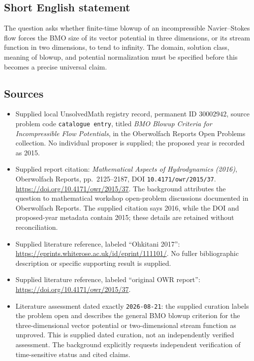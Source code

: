 \documentclass[11pt]{article}
\begin{document}
\subsection{Short English statement}
The question asks whether finite-time blowup of an incompressible Navier--Stokes flow forces the BMO size of its vector potential in three dimensions, or its stream function in two dimensions, to tend to infinity. The domain, solution class, meaning of blowup, and potential normalization must be specified before this becomes a precise universal claim.
\subsection{Sources}
\begin{itemize}
\item Supplied local UnsolvedMath registry record, permanent ID \(30002942\), source problem code \texttt{catalogue entry}, titled \emph{BMO Blowup Criteria for Incompressible Flow Potentials}, in the Oberwolfach Reports Open Problems collection. No individual proposer is supplied; the proposed year is recorded as 2015.
\item Supplied report citation: \emph{Mathematical Aspects of Hydrodynamics (2016)}, Oberwolfach Reports, pp.\ 2125--2187, DOI \texttt{10.4171/owr/2015/37}. \url{https://doi.org/10.4171/owr/2015/37}. The background attributes the question to mathematical workshop open-problem discussions documented in Oberwolfach Reports. The supplied citation says 2016, while the DOI and proposed-year metadata contain 2015; these details are retained without reconciliation.
\item Supplied literature reference, labeled ``Ohkitani 2017'': \url{https://eprints.whiterose.ac.uk/id/eprint/111101/}. No fuller bibliographic description or specific supporting result is supplied.
\item Supplied literature reference, labeled ``original OWR report'': \url{https://doi.org/10.4171/owr/2015/37}.
\item Literature assessment dated exactly \texttt{2026-08-21}: the supplied curation labels the problem open and describes the general BMO blowup criterion for the three-dimensional vector potential or two-dimensional stream function as unproved. This is supplied dated curation, not an independently verified assessment. The background explicitly requests independent verification of time-sensitive status and cited claims.
\end{itemize}
\end{document}
